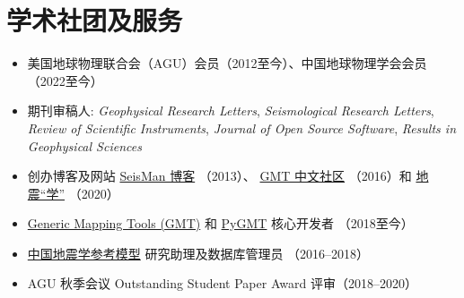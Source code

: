 \section{学术社团及服务}

\begin{itemize}
\item 美国地球物理联合会（AGU）会员（2012至今）、中国地球物理学会会员（2022至今）
\item 期刊审稿人:
      \emph{Geophysical Research Letters},
      \emph{Seismological Research Letters},
      \emph{Review of Scientific Instruments},
      \emph{Journal of Open Source Software},
      \emph{Results in Geophysical Sciences}
\item 创办博客及网站
	  \href{https://blog.seisman.info}{SeisMan 博客} （2013）、
	  \href{http://gmt-china.org/}{GMT 中文社区} （2016）和
	  \href{https://seismo-learn.org/}{地震``学''} （2020）
\item \href{https://github.com/GenericMappingTools/gmt}{Generic Mapping Tools (GMT)} 和
	  \href{https://github.com/GenericMappingTools/pygmt}{PyGMT} 核心开发者 （2018至今）
\item \href{http://chinageorefmodel.org/}{中国地震学参考模型} 研究助理及数据库管理员 （2016--2018）
\item AGU 秋季会议 Outstanding Student Paper Award 评审（2018--2020）
\end{itemize}

